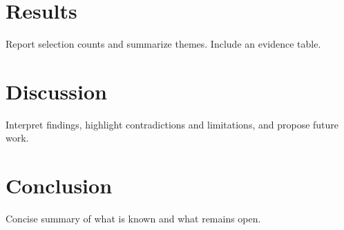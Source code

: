 \documentclass[11pt]{article}
\begin{document}
\section{Results}
Report selection counts and summarize themes. Include an evidence table.

\section{Discussion}
Interpret findings, highlight contradictions and limitations, and propose future work.

\section{Conclusion}
Concise summary of what is known and what remains open.



\end{document}

